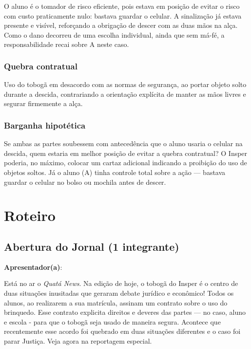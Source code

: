 \documentclass[a4paper,12pt]{article}[abntex2]
\begin{document}
O aluno é o tomador de risco eficiente, pois estava em posição de evitar o risco com custo praticamente nulo: bastava guardar o celular. A sinalização já estava presente e visível, reforçando a obrigação de descer com as duas mãos na alça. Como o dano decorreu de uma escolha individual, ainda que sem má-fé, a responsabilidade recai sobre A neste caso.

\subsubsection*{Quebra contratual}

Uso do tobogã em desacordo com as normas de segurança, ao portar objeto solto durante a descida, contrariando a orientação explícita de manter as mãos livres e segurar firmemente a alça.

\subsubsection*{Barganha hipotética}

Se ambas as partes soubessem com antecedência que o aluno usaria o celular na descida, quem estaria em melhor posição de evitar a quebra contratual? O Insper poderia, no máximo, colocar um cartaz adicional indicando a proibição do uso de objetos soltos. Já o aluno (A) tinha controle total sobre a ação --- bastava guardar o celular no bolso ou mochila antes de descer.
\newpage
\section{Roteiro}
\subsection*{Abertura do Jornal (1 integrante)}
\textbf{Apresentador(a)}:


 Está no ar o \textit{Quatá News}.\newline
Na edição de hoje, o tobogã do Insper é o centro de duas situações inusitadas que geraram debate jurídico e econômico! \newline
Todos os alunos, ao realizarem a sua matrícula, assinam um contrato sobre o uso do brinquedo.  Esse contrato explicita direitos e deveres das partes — no caso, aluno e escola - para que o tobogã seja usado de maneira segura. \newline
Acontece que recentemente esse acordo foi quebrado em duas situações diferentes e o caso foi parar Justiça. Veja agora na reportagem especial.
\end{document}
